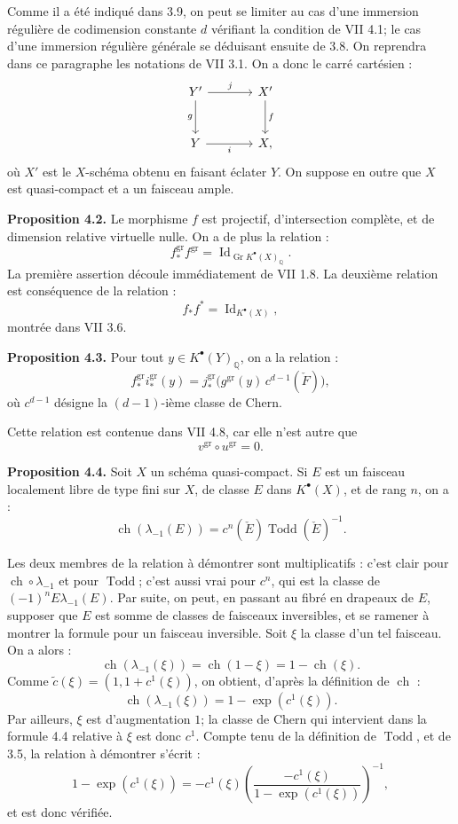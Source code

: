 \documentclass[11pt]{article}
\newcommand{\Gr}{\operatorname{Gr}}
\newcommand{\ch}{\operatorname{ch}}
\newcommand{\Todd}{\operatorname{Todd}}
\providecommand{\ch}{\operatorname{ch}}
\providecommand{\Todd}{\operatorname{Todd}}
\providecommand{\Gr}{\operatorname{Gr}}
\providecommand{\Gr}{\operatorname{G}}
\begin{document}
Comme il a été indiqué dans 3.9, on peut se limiter au cas d'une immersion régulière de codimension constante \(d\) vérifiant la condition de VII 4.1; le cas d'une immersion régulière générale se déduisant ensuite de 3.8. On reprendra dans ce paragraphe les notations de VII 3.1. On a donc le carré cartésien :
\[
\begin{tikzcd}[column sep=large,row sep=large]
Y' \arrow[r,"j"] \arrow[d,"g"'] & X' \arrow[d,"f"]\\
Y \arrow[r,"i"'] & X ,
\end{tikzcd}
\]
où \(X'\) est le \(X\)-schéma obtenu en faisant éclater \(Y\). On suppose en outre que \(X\) est quasi-compact et a un faisceau ample.

\textbf{Proposition 4.2.} Le morphisme \(f\) est projectif, d'intersection complète, et de dimension relative virtuelle nulle. On a de plus la relation :
\[
 f^{\mathrm{gr}}_* f^{\mathrm{gr}}=\operatorname{Id}_{\Gr K^{\bullet}(X)_{\mathbb Q}} .
\]
La première assertion découle immédiatement de VII 1.8. La deuxième relation est conséquence de la relation :
\[
 f_*f^*=\operatorname{Id}_{K^{\bullet}(X)},
\]
montrée dans VII 3.6.

\textbf{Proposition 4.3.} Pour tout \(y\in K^{\bullet}(Y)_{\mathbb Q}\), on a la relation :
\[
 f^{\mathrm{gr}}_* i^{\mathrm{gr}}_*(y)
 =
 j^{\mathrm{gr}}_*\bigl(g^{\mathrm{gr}}(y)\,c^{d-1}(\check F)\bigr),
\]
où \(c^{d-1}\) désigne la \((d-1)\)-ième classe de Chern.

Cette relation est contenue dans VII 4.8, car elle n'est autre que
\[
 v^{\mathrm{gr}}\circ u^{\mathrm{gr}}=0 .
\]

\textbf{Proposition 4.4.} Soit \(X\) un schéma quasi-compact. Si \(E\) est un faisceau localement libre de type fini sur \(X\), de classe \(E\) dans \(K^{\bullet}(X)\), et de rang \(n\), on a :
\[
 \ch(\lambda_{-1}(E))=c^n(\check E)\Todd(\check E)^{-1}.
\]

Les deux membres de la relation à démontrer sont multiplicatifs : c'est clair pour \(\ch\circ\lambda_{-1}\) et pour \(\Todd\); c'est aussi vrai pour \(c^n\), qui est la classe de \((-1)^nE\lambda_{-1}(E)\). Par suite, on peut, en passant au fibré en drapeaux de \(E\), supposer que \(E\) est somme de classes de faisceaux inversibles, et se ramener à montrer la formule pour un faisceau inversible. Soit \(\xi\) la classe d'un tel faisceau. On a alors :
\[
 \ch(\lambda_{-1}(\xi))=\ch(1-\xi)=1-\ch(\xi).
\]
Comme \(\widetilde c(\xi)=(1,1+c^1(\xi))\), on obtient, d'après la définition de \(\ch\) :
\[
 \ch(\lambda_{-1}(\xi))=1-\exp(c^1(\xi)).
\]
Par ailleurs, \(\xi\) est d'augmentation \(1\); la classe de Chern qui intervient dans la formule 4.4 relative à \(\xi\) est donc \(c^1\). Compte tenu de la définition de \(\Todd\), et de 3.5, la relation à démontrer s'écrit :
\[
 1-\exp(c^1(\xi))
 =
 -c^1(\xi)\left(\frac{-c^1(\xi)}{1-\exp(c^1(\xi))}\right)^{-1},
\]
et est donc vérifiée.
\end{document}
